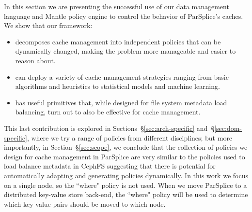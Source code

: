 In this section we are presenting the successful use of our data management
language and Mantle policy engine to control the behavior of ParSplice's
caches. We show that our framework:

\begin{itemize}

  \item decomposes cache management into independent policies that can be
  dynamically changed, making the problem more manageable and easier to reason
  about.

  \item can deploy a variety of cache management strategies ranging from basic
  algorithms and heuristics to statistical models and machine learning.

  \item has useful primitives that, while designed for file system metadata
  load balancing, turn out to also be effective for cache management. 

\end{itemize}


This last contribution is explored in Sections~\S\ref{sec:arch-specific}
and~\S\ref{sec:dom-specific}, where we try a range of policies from different
disciplines; but more importantly, in Section~\S\ref{sec:scope}, we conclude
that the collection of policies we design for cache management in ParSplice are
very similar to the policies used to load balance metadata in CephFS suggesting
that there is potential for automatically adapting and generating policies
dynamically.  In this work we focus on a single node, so the ``where" policy is
not used. When we move ParSplice to a distributed key-value store back-end, the
``where" policy will be used to determine which key-value pairs should be moved
to which node.




